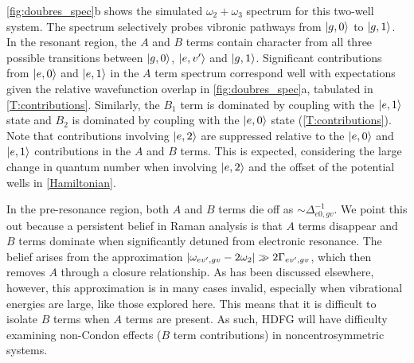\documentclass[aip, jcp, reprint, onecolumn, nofootinbib]{revtex4-2}
\begin{document}
\autoref{fig:doubres_spec}b shows the simulated $\omega_2+\omega_3$ spectrum for this two-well system.  The spectrum selectively probes vibronic pathways from $\ket{g,0}$ to $\ket{g,1}$.
In the resonant region, the $A$ and $B$ terms contain character from all three possible transitions between $\ket{g,0}$, $\ket{e,v'}$ and $\ket{g,1}$. 
Significant contributions from $\ket{e,0}$ and $\ket{e,1}$ in the $A$ term spectrum correspond well with expectations given the relative wavefunction overlap in \autoref{fig:doubres_spec}a, tabulated in \autoref{T:contributions}. 
Similarly, the $B_1$ term is dominated by coupling with the $\ket{e,1}$ state and $B_2$ is dominated by coupling with the $\ket{e,0}$ state (\autoref{T:contributions}). 
Note that contributions involving $\ket{e,2}$ are suppressed relative to the $\ket{e,0}$ and $\ket{e,1}$ contributions in the $A$ and $B$ terms.
This is expected, considering the large change in quantum number when involving $\ket{e,2}$ and the offset of the potential wells in \autoref{Hamiltonian}.

In the pre-resonance region, both $A$ and $B$ terms die off as $\sim \Delta_{e0,gv}^{-1}$.
We point this out because a persistent belief in Raman analysis is that $A$ terms disappear and $B$ terms dominate when significantly detuned from electronic resonance.
The belief arises from the approximation $\abs{\omega_{ev',gv} - 2\omega_2} \gg 2\Gamma_{ev',gv}$, which then removes $A$ through a closure relationship.\cite{Neddersen1989}
As has been discussed elsewhere, however, this approximation is in many cases invalid, especially when vibrational energies are large, like those explored here.\cite{Warshel1977, Li1990, Gong2015}
This means that it is difficult to isolate $B$ terms when $A$ terms are present.
As such, HDFG will have difficulty examining non-Condon effects ($B$ term contributions) in noncentrosymmetric systems.
\end{document}
